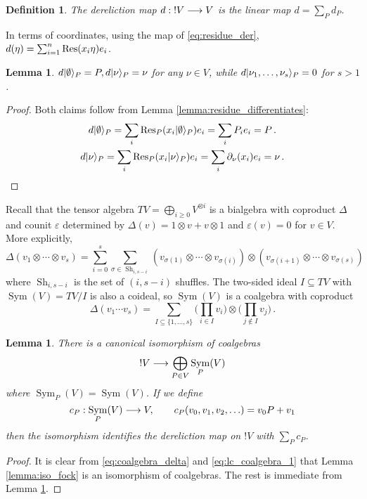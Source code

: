 \documentclass[english,letter paper,12pt,reqno]{article}
\DeclarePairedDelimiter\ket{\lvert}{\rangle}
\newtheorem{lemma}[theorem]{Lemma}
\theoremstyle{example}
\newtheorem{definition}[theorem]{Definition}
\numberwithin{equation}{section}
\def\vacu{\ket{\emptyset}}
\DeclareMathOperator{\Sym}{Sym}
\begin{document}
\begin{definition} The \emph{dereliction} map $d: {!}V \longrightarrow V$ is the linear map $d = \sum_P d_P$.
\end{definition}

In terms of coordinates, using the map of \eqref{eq:residue_der}, $d( \eta ) = \sum_{i=1}^n \operatorname{Res}\!\,( x_i \eta ) e_i$.

\begin{lemma}\label{lemma:dereliction_describe} $d \vacu_P = P, d \ket{\nu}_P = \nu$ for any $\nu \in V$, while $d \ket{\nu_1,\ldots,\nu_s}_P = 0$ for $s > 1$.
\end{lemma}
\begin{proof}
Both claims follow from Lemma \ref{lemma:residue_differentiates}:
\begin{gather*}
d \vacu_P = \sum_i \Res_P( x_i \vacu_P ) e_i = \sum_i P_i e_i = P\,.\\
d \ket{\nu}_P = \sum_i \Res_P( x_i \ket{\nu}_P ) e_i = \sum_i \partial_\nu( x_i ) e_i = \nu\,.
\end{gather*}
\end{proof}

Recall that the tensor algebra $TV = \bigoplus_{i \ge 0} V^{\otimes i}$ is a bialgebra with coproduct $\Delta$ and counit $\varepsilon$ determined by $\Delta(v) = 1 \otimes v + v \otimes 1$ and $\varepsilon(v) = 0$ for $v \in V$. More explicitly,
\begin{equation}
\Delta(v_1 \otimes \cdots \otimes v_s) = \sum_{i=0}^s \sum_{\sigma \in \operatorname{Sh}_{i,s-i}} ( v_{\sigma(1)} \otimes \cdots \otimes v_{\sigma(i)} ) \otimes ( v_{\sigma(i+1)} \otimes \cdots \otimes v_{\sigma(s)} )
\end{equation}
where $\operatorname{Sh}_{i,s-i}$ is the set of $(i,s-i)$ shuffles. The two-sided ideal $I \subseteq TV$ with $\Sym(V) = TV/I$ is also a coideal, so $\Sym(V)$ is a coalgebra with coproduct
\begin{equation}\label{eq:coalgebra_delta}
\Delta( v_1 \cdots v_s ) = \sum_{I \subseteq \{1,\ldots,s\}} \Big(\prod_{i \in I} v_i\Big) \otimes \Big(\prod_{j \notin I} v_j\Big)\,.
\end{equation}

\begin{lemma}\label{lemma:relate_to_fock} There is a canonical isomorphism of coalgebras
\begin{equation}
{!} V \lto \bigoplus_{P \in V} \Sym_P(V)
\end{equation}
where $\Sym_P(V) = \Sym(V)$. If we define
\[
c_P: \Sym_P(V) \lto V, \qquad c_P( v_0, v_1, v_2, \ldots ) = v_0 P + v_1
\]
then the isomorphism identifies the dereliction map on ${!} V$ with $\sum_P c_P$.
\end{lemma}
\begin{proof}
It is clear from \eqref{eq:coalgebra_delta} and \eqref{eq:lc_coalgebra_1} that Lemma \ref{lemma:iso_fock} is an isomorphism of coalgebras. The rest is immediate from Lemma \ref{lemma:dereliction_describe}.
\end{proof}
\end{document}
